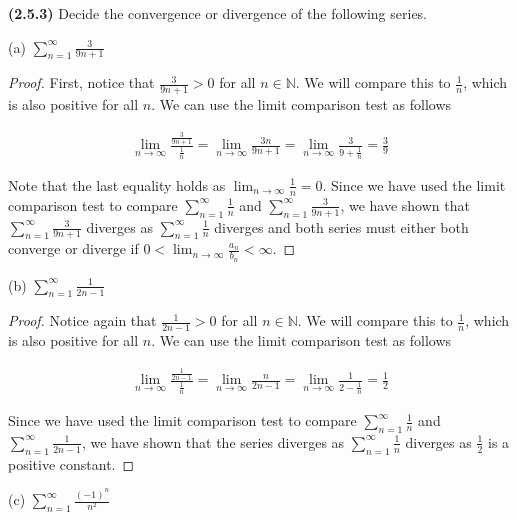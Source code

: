 \documentclass[12pt]{article}
\newcommand{\limtoinf}[1][n]{\displaystyle\lim_{ {#1} \to \infty}}
\newcommand{\series}[2]{\displaystyle \sum_{ {#1} }^{ {#2} }}
\newcommand{\bN}{\mathbb{N}}
\begin{document}
\newpage

\noindent \textbf{(2.5.3)} Decide the convergence or divergence of the following series.

\noindent (a) $\series{n=1}{\infty}\frac{3}{9n+1}$

\begin{proof}
	First, notice that $\frac{3}{9n+1}>0$ for all $n\in\bN$. We will compare this to $\frac{1}{n}$, which is also positive for all $n$. We can use the limit comparison test as follows
	
\begin{align*}
	\limtoinf\frac{\frac{3}{9n+1}}{\frac{1}{n}}=\limtoinf\frac{3n}{9n+1}=\limtoinf\frac{3}{9+\frac{1}{n}}=\frac{3}{9}
\end{align*}

Note that the last equality holds as $\limtoinf\frac{1}{n}=0$. Since we have used the limit comparison test to compare $\series{n=1}{\infty}\frac{1}{n}$ and $\series{n=1}{\infty}\frac{3}{9n+1}$, we have shown that $\series{n=1}{\infty}\frac{3}{9n+1}$ diverges as $\series{n=1}{\infty}\frac{1}{n}$ diverges and both series must either both converge or diverge if $0<\limtoinf\frac{a_n}{b_n}<\infty$.
\end{proof}


\noindent (b) $\series{n=1}{\infty}\frac{1}{2n-1}$

\begin{proof}
	Notice again that $\frac{1}{2n-1}>0$ for all $n\in\bN$. We will compare this to $\frac{1}{n}$, which is also positive for all $n$. We can use the limit comparison test as follows
	
\begin{align*}
	\limtoinf\frac{\frac{1}{2n-1}}{\frac{1}{n}}=\limtoinf\frac{n}{2n-1}=\limtoinf\frac{1}{2-\frac{1}{n}}=\frac{1}{2}
\end{align*}

Since we have used the limit comparison test to compare $\series{n=1}{\infty}\frac{1}{n}$ and $\series{n=1}{\infty}\frac{1}{2n-1}$, we have shown that the series diverges as $\series{n=1}{\infty}\frac{1}{n}$ diverges as $\frac{1}{2}$ is a positive constant.
\end{proof}

\noindent (c) $\series{n=1}{\infty}\frac{(-1)^n}{n^2}$
\end{document}
